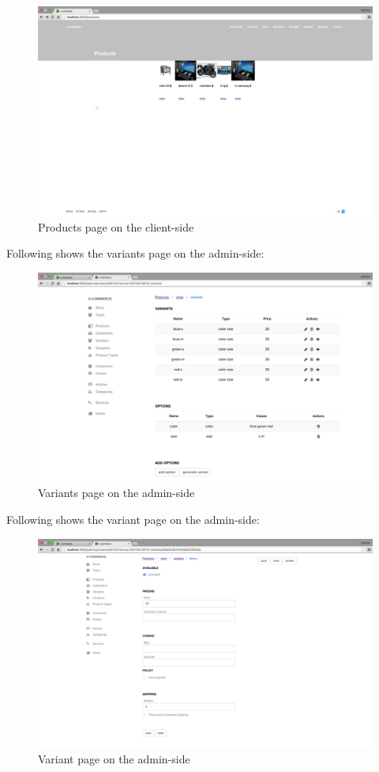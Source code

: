 \begin{figure}[htb]
\centering
\includegraphics[width=1.0\linewidth]{images/chapter4/page-products-all-cli.png}\hfill
\caption[Products page on the client-side]{Products page on the client-side}
\label{fig:page_products_client_side}
\end{figure}
Following shows the variants page on the admin-side:
\begin{figure}[htb]
\centering
\includegraphics[width=1.0\linewidth]{images/chapter4/page-variants.png}\hfill
\caption[Variants page on the admin-side]{Variants page on the admin-side}
\label{fig:page_variants_admin_side}
\end{figure}
Following shows the variant page on the admin-side:
\begin{figure}[htb]
\centering
\includegraphics[width=1.0\linewidth]{images/chapter4/page-variant.png}\hfill
\caption[Variant page on the admin-side]{Variant page on the admin-side}
\label{fig:page_variants_admin_side}
\end{figure}


